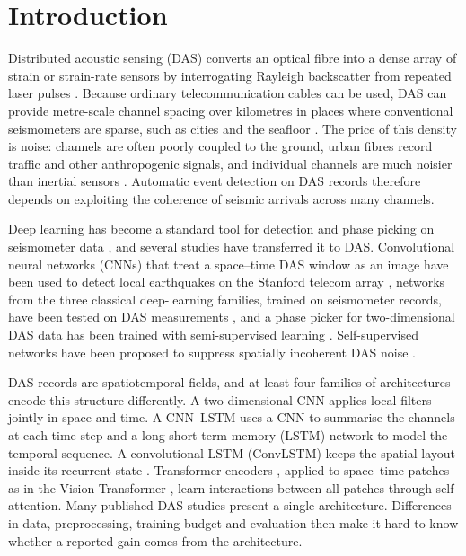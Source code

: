 \section*{Introduction}
Distributed acoustic sensing (DAS) converts an optical fibre into a dense array of strain or strain-rate sensors by interrogating Rayleigh backscatter from repeated laser pulses \citep{Zhan2020,LindseyMartin2021}. Because ordinary telecommunication cables can be used, DAS can provide metre-scale channel spacing over kilometres in places where conventional seismometers are sparse, such as cities \citep{Lindsey2017,Huot2024} and the seafloor \citep{Ide2021}. The price of this density is noise: channels are often poorly coupled to the ground, urban fibres record traffic and other anthropogenic signals, and individual channels are much noisier than inertial sensors \citep{Zhan2020,LindseyMartin2021}. Automatic event detection on DAS records therefore depends on exploiting the coherence of seismic arrivals across many channels.

Deep learning has become a standard tool for detection and phase picking on seismometer data \citep{ZhuBeroza2019,Mousavi2020,MousaviBeroza2022}, and several studies have transferred it to DAS. Convolutional neural networks (CNNs) that treat a space--time DAS window as an image have been used to detect local earthquakes on the Stanford telecom array \citep{Huot2024}, networks from the three classical deep-learning families, trained on seismometer records, have been tested on DAS measurements \citep{Hernandez2022}, and a phase picker for two-dimensional DAS data has been trained with semi-supervised learning \citep{Zhu2023}. Self-supervised networks have been proposed to suppress spatially incoherent DAS noise \citep{vandenEnde2023}.

DAS records are spatiotemporal fields, and at least four families of architectures encode this structure differently. A two-dimensional CNN applies local filters jointly in space and time. A CNN--LSTM uses a CNN to summarise the channels at each time step and a long short-term memory (LSTM) network \citep{Hochreiter1997} to model the temporal sequence. A convolutional LSTM (ConvLSTM) keeps the spatial layout inside its recurrent state \citep{Shi2015}. Transformer encoders \citep{Vaswani2017}, applied to space--time patches as in the Vision Transformer \citep{Dosovitskiy2021}, learn interactions between all patches through self-attention. Many published DAS studies present a single architecture. Differences in data, preprocessing, training budget and evaluation then make it hard to know whether a reported gain comes from the architecture.

